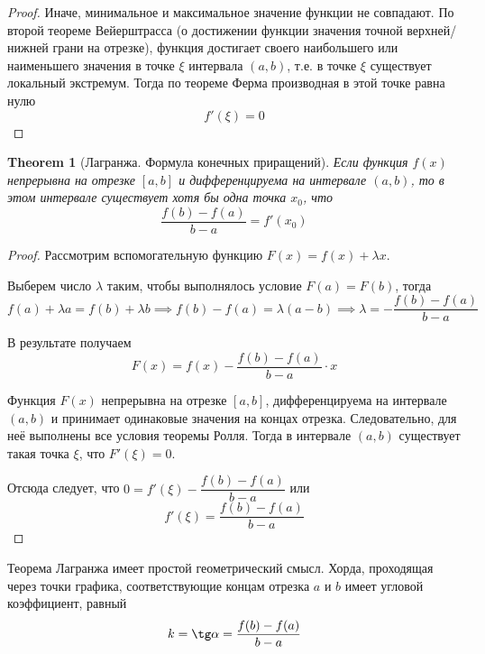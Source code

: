 \documentclass[a4paper]{article}
\theoremstyle{named}
\newtheorem*{namedtheorem}{Theorem}
\begin{document}
\begin{colloq}
\begin{proof}
			Иначе, минимальное и максимальное значение функции не совпадают. По второй теореме Вейерштрасса (о достижении функции значения точной верхней/нижней грани на отрезке), функция достигает своего наибольшего или наименьшего значения в точке $\xi$ интервала $(a, b)$, т.е. в точке $\xi$ существует локальный экстремум. Тогда по теореме Ферма производная в этой точке равна нулю
			\begin{equation*}
				f'(\xi) = 0
			\end{equation*}
		\end{proof}

		\begin{namedtheorem}[Лагранжа. Формула конечных приращений]
			Если функция $f(x)$ непрерывна на отрезке $[a, b]$ и дифференцируема на интервале $(a, b)$, то в этом интервале существует хотя бы одна точка $x_0$, что
			\begin{equation*}
				\dfrac{f(b) - f(a)}{b - a} = f'(x_0)
			\end{equation*}
		\end{namedtheorem}

		\begin{proof}
			Рассмотрим вспомогательную функцию $F(x) = f(x) + \lambda x$.

			Выберем число $\lambda$ таким, чтобы выполнялось условие $F(a) = F(b)$, тогда
			\begin{equation*}
				f(a) + \lambda a = f(b) + \lambda b 
				\implies f(b) - f(a) = \lambda(a - b) 
				\implies \lambda = -\dfrac{f(b) - f(a)}{b - a}
			\end{equation*}

			В результате получаем
			\begin{equation*}
				F(x) = f(x) - \dfrac{f(b) - f(a)}{b - a} \cdot x
			\end{equation*}

			Функция $F(x)$ непрерывна на отрезке $[a, b]$, дифференцируема на интервале $(a, b)$ и принимает одинаковые значения на концах отрезка. Следовательно, для неё выполнены все условия теоремы Ролля. Тогда в интервале $(a, b)$ существует такая точка $\xi$, что $F'(\xi) = 0$.

			Отсюда следует, что $0 = f'(\xi) - \dfrac{f(b) - f(a)}{b - a}$ или
			\begin{equation*}
				f'(\xi) = \dfrac{f(b) - f(a)}{b - a}
			\end{equation*}
		\end{proof}

		Теорема Лагранжа имеет простой геометрический смысл. Хорда, проходящая через точки графика, соответствующие концам отрезка $a$ и $b$ имеет угловой коэффициент, равный
		\begin{equation*}
			k = \tg \alpha = \dfrac{f(b) - f(a)}{b - a}
		\end{equation*}


\end{colloq}
\end{document}
